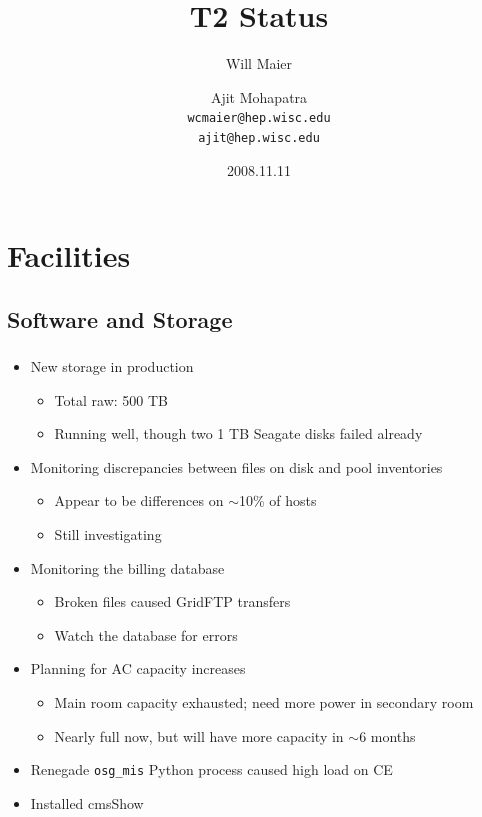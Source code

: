 \documentclass{beamer}
\title{T2 Status}
\author[Maier, Mohapatra]{
    Will Maier \and Ajit Mohapatra\\ 
    {\tt wcmaier@hep.wisc.edu}\\
    {\tt ajit@hep.wisc.edu}}
\institute[Wisconsin]{University of Wisconsin - High Energy Physics}
\date{2008.11.11}
\newcommand{\ca}{\ensuremath{\sim}}
\begin{document}
\begin{frame}
    \titlepage
\end{frame}


\section{Facilities}
\subsection{Software and Storage}
\begin{frame}
\frametitle{}
\begin{itemize}
    \item New storage in production
    \begin{itemize}
        \item Total raw: 500 TB
        \item Running well, though two 1 TB Seagate disks failed already
    \end{itemize}
    \item Monitoring discrepancies between files on disk and pool inventories
    \begin{itemize}
        \item Appear to be differences on \ca{}10\% of hosts
        \item Still investigating
    \end{itemize}
    \item Monitoring the billing database
    \begin{itemize}
        \item Broken files caused GridFTP transfers
        \item Watch the database for errors
    \end{itemize}
    \item Planning for AC capacity increases
    \begin{itemize}
        \item Main room capacity exhausted; need more power in secondary room
        \item Nearly full now, but will have more capacity in \ca{}6 months
    \end{itemize}
    \item Renegade {\tt osg\_mis} Python process caused high load on CE
    \item Installed cmsShow
\end{itemize}
\end{frame}
\end{document}
